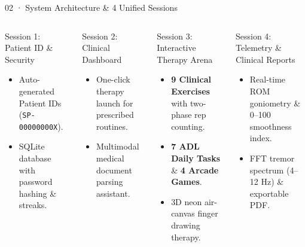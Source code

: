 \documentclass[aspectratio=169,11pt]{beamer}
\begin{document}
\begin{frame}{02 · System Architecture \& 4 Unified Sessions}
\begin{columns}[T]
\begin{block}{Session 1: Patient ID \& Security}
\begin{itemize}
    \setlength{\itemsep}{1pt}
    \item Auto-generated Patient IDs (\texttt{SP-00000000X}).
    \item SQLite database with password hashing \& streaks.
\end{itemize}
\end{block}

\vspace{2mm}
\begin{block}{Session 2: Clinical Dashboard}
\begin{itemize}
    \setlength{\itemsep}{1pt}
    \item One-click therapy launch for prescribed routines.
    \item Multimodal medical document parsing assistant.
\end{itemize}
\end{block}

\begin{block}{Session 3: Interactive Therapy Arena}
\begin{itemize}
    \setlength{\itemsep}{1pt}
    \item \textbf{9 Clinical Exercises} with two-phase rep counting.
    \item \textbf{7 ADL Daily Tasks} \& \textbf{4 Arcade Games}.
    \item 3D neon air-canvas finger drawing therapy.
\end{itemize}
\end{block}

\vspace{2mm}
\begin{block}{Session 4: Telemetry \& Clinical Reports}
\begin{itemize}
    \setlength{\itemsep}{1pt}
    \item Real-time ROM goniometry \& 0--100 smoothness index.
    \item FFT tremor spectrum (4--12 Hz) \& exportable PDF.
\end{itemize}
\end{block}
\end{columns}
\end{frame}
\end{document}
